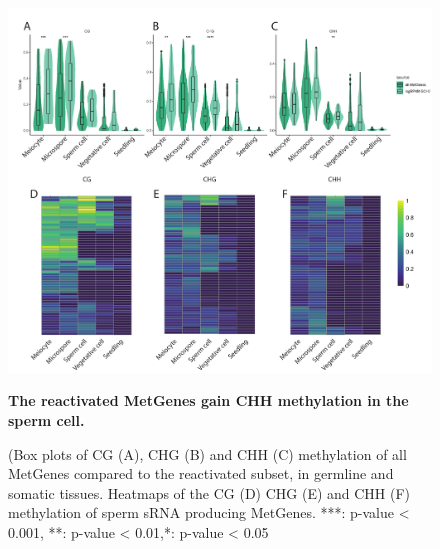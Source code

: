 \begin{figure}[htbp!] 
\centering    
    \includegraphics[width=1\textwidth]{Chapter2/Figs/Figure12_Reactivated_MetGenes_methylation.pdf}
\caption{\textbf{The reactivated MetGenes gain CHH methylation in the sperm cell.}}
\label{fig:boxplot_MetGene_methylation}
\captionsetup{font=small}
    \caption*{(Box plots of CG (A), CHG (B) and CHH (C) methylation of all MetGenes compared to the reactivated subset, in germline and somatic tissues. Heatmaps of the CG (D) CHG (E) and CHH (F) methylation of sperm sRNA producing MetGenes. ***: p-value < 0.001, **: p-value < 0.01,*: p-value < 0.05}
\end{figure}

